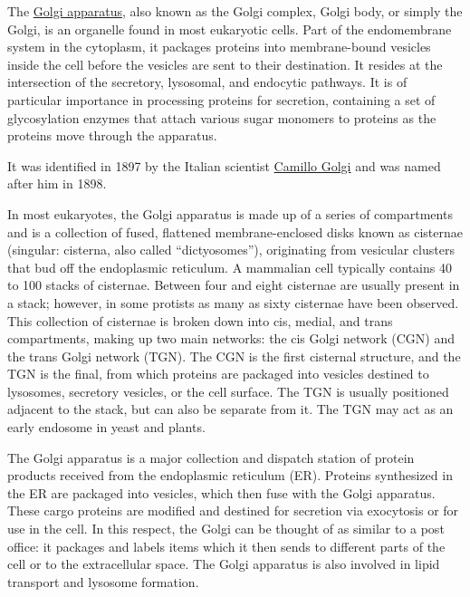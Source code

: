 The \href{https://en.wikipedia.org/wiki/Golgi_apparatus}{Golgi apparatus}, also known as the Golgi complex, Golgi body, or simply the Golgi, is an organelle found in most eukaryotic cells. Part of the endomembrane system in the cytoplasm, it packages proteins into membrane-bound vesicles inside the cell before the vesicles are sent to their destination. It resides at the intersection of the secretory, lysosomal, and endocytic pathways. It is of particular importance in processing proteins for secretion, containing a set of glycosylation enzymes that attach various sugar monomers to proteins as the proteins move through the apparatus.

It was identified in 1897 by the Italian scientist \href{https://en.wikipedia.org/wiki/Camillo_Golgi}{Camillo Golgi} and was named after him in 1898.

In most eukaryotes, the Golgi apparatus is made up of a series of compartments and is a collection of fused, flattened membrane-enclosed disks known as cisternae (singular: cisterna, also called ``dictyosomes''), originating from vesicular clusters that bud off the endoplasmic reticulum. A mammalian cell typically contains 40 to 100 stacks of cisternae. Between four and eight cisternae are usually present in a stack; however, in some protists as many as sixty cisternae have been observed. This collection of cisternae is broken down into cis, medial, and trans compartments, making up two main networks: the cis Golgi network (CGN) and the trans Golgi network (TGN). The CGN is the first cisternal structure, and the TGN is the final, from which proteins are packaged into vesicles destined to lysosomes, secretory vesicles, or the cell surface. The TGN is usually positioned adjacent to the stack, but can also be separate from it. The TGN may act as an early endosome in yeast and plants.

The Golgi apparatus is a major collection and dispatch station of protein products received from the endoplasmic reticulum (ER). Proteins synthesized in the ER are packaged into vesicles, which then fuse with the Golgi apparatus. These cargo proteins are modified and destined for secretion via exocytosis or for use in the cell. In this respect, the Golgi can be thought of as similar to a post office: it packages and labels items which it then sends to different parts of the cell or to the extracellular space. The Golgi apparatus is also involved in lipid transport and lysosome formation.



